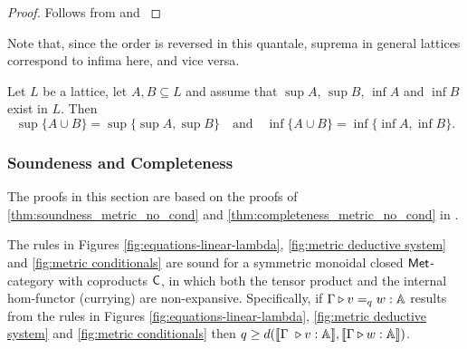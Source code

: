 \begin{proof}
  Follows from \cite{dahlqvist2023syntactic}  and  \cite[Proposition I-1.8]{gierzContinuousLatticesDomains2003}
\end{proof}

Note that, since the order is reversed in this quantale, suprema in general lattices correspond to infima here, and vice versa.

\begin{lemma} \cite[Lemma 2.23]{daveyIntroductionLatticesOrder2002} \label{lem:sup_union}
Let \( L \) be a lattice, let \( A, B \subseteq L \) and assume that \( \sup A \),
\( \sup B \), \( \inf A \) and \( \inf B \) exist in \( L \). Then
$$ \sup\{A \cup B\} = \sup\{ \sup A, \sup B \}  \quad \text{and} \quad \inf\{A \cup B\} = \inf\{ \inf A, \inf B \}
 . $$
\end{lemma}




\subsubsection{Soundeness and Completeness}
The proofs in this section are based on the proofs of 
\autoref{thm:soundness_metric_no_cond} and \autoref{thm:completeness_metric_no_cond} in \cite{dahlqvist2023syntactic}.

\begin{theorem}
  The rules in Figures \ref{fig:equations-linear-lambda}, \ref{fig:metric deductive system} and \ref{fig:metric conditionals} are sound for a  symmetric monoidal closed $\mathsf{Met}$-category with coproducts $\mathsf{C}$, in which both the tensor product and the internal hom-functor (currying) are non-expansive. Specifically, if $\Gamma \triangleright v =_{q} w : \mathbb{A} $ results from the rules in Figures  \ref{fig:equations-linear-lambda}, \ref{fig:metric deductive system} and \ref{fig:metric conditionals} then $q \geq d( \llbracket \Gamma  \vljud v : \typeA \rrbracket, \llbracket\Gamma \vljud w : \typeA \rrbracket)$.
\end{theorem}

